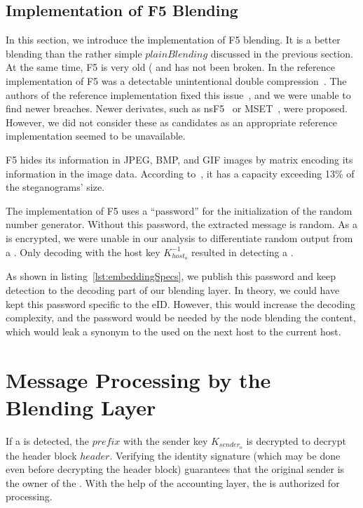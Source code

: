 \subsection{Implementation of F5 Blending}
In this section, we introduce the implementation of F5 blending. It is a better blending than the rather simple $plainBlending$ discussed in the previous section. At the same time, F5 is very old (\citeyear{f5} and has not been broken. In the reference implementation of F5 was a detectable unintentional double compression~\cite{steganalysisf5}. The authors of the reference implementation fixed this issue~\cite{F5broken}, and we were unable to find newer breaches. Newer derivates, such as nsF5~\cite{fridrich2007statistically} or MSET~\cite{hosseini2015modification}, were proposed. However, we did not consider these as candidates as an appropriate reference implementation seemed to be unavailable.

F5 hides its information in JPEG, BMP, and GIF images by matrix encoding its information in the image data. According to~\cite{f5}, it has a capacity exceeding 13\% of the steganograms' size.

The implementation of F5 uses a ``password'' for the initialization of the random number generator. Without this password, the extracted message is random. As a \VortexMessage{} is encrypted, we were unable in our analysis to differentiate random output from a \VortexMessage. Only decoding with the host key $K^{-1}_{host_o}$ resulted in detecting a \VortexMessage.

As shown in listing~\ref{lst:embeddingSpecs}, we publish this password and keep detection to the decoding part of our blending layer. In theory, we could have kept this password specific to the eID. However, this would increase the decoding complexity, and the password would be needed by the node blending the content, which would leak a synonym to the  used on the next host to the current host.

\section{Message Processing by the Blending Layer}
If a \VortexMessage{} is detected, the $prefix$ with the sender key $K_{sender_o}$ is decrypted to decrypt the header block $header$. Verifying the identity signature (which may be done even before decrypting the header block) guarantees that the original sender is the owner of the . With the help of the accounting layer, the \VortexMessage{} is authorized for processing. 

